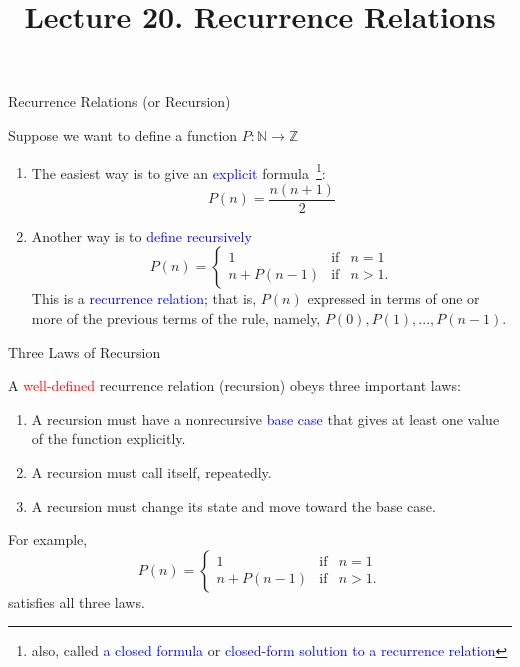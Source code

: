 \documentclass[aspectratio=169]{beamer}
\title{Lecture 20. Recurrence Relations}
\date{ }
\providecommand{\Blue}[1]{\textcolor{blue}{#1}}
\providecommand{\Red}[1]{\textcolor{red}{#1}}
\begin{document}
\frame[plain]{\titlepage}

\begin{frame}[plain]{Recurrence Relations (or Recursion)}

  Suppose we want to define a function
    $ P: \mathbb{N}\rightarrow\mathbb{Z}$  
    \begin{enumerate}
      \item The easiest way is to give 
      an \Blue{explicit} formula~\footnote{also, called 
        \Blue{a closed formula} or \Blue{closed-form solution to a recurrence
        relation}}:
        \[ P(n)= \frac{n(n+1)}{2}  \] 
      \item Another way is to \Blue{define recursively}
        \[ P(n) = \left\{  \begin{array}{ccc}
                            1 &\mbox{if}& n=1\\
                            n+P(n-1) &\mbox{if}& n>1.
                           \end{array} \right. 
        \]
        This is a \Blue{recurrence relation}; that is,  $P(n)$ 
        expressed
        in terms of one or more of the previous terms of the rule, namely, 
        $P(0), P(1), ..., P(n-1)$. 
        
    \end{enumerate} 

\end{frame}

\begin{frame}[plain]{Three Laws of Recursion}

   A \Red{well-defined} recurrence relation (recursion) obeys three important laws:
    \begin{enumerate}
      \item A recursion must have a nonrecursive 
           \Blue{base case} that gives at least one value of the function explicitly.  
     \item A recursion must call itself, repeatedly.
      \item A recursion must change its state and move toward the base case.
    \end{enumerate}
    \medskip
    
   For example, 
    \[ P(n) = \left\{  \begin{array}{ccc}
                            1 &\mbox{if}& n=1\\
                            n+P(n-1) &\mbox{if}& n>1.
                           \end{array} \right. 
        \]
        satisfies all three laws.
 
\end{frame}
\end{document}
